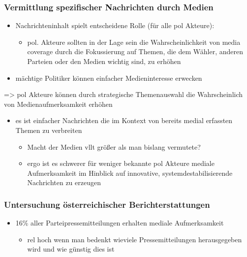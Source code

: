 \documentclass[11pt]{article}
\begin{document}
\subsubsection{Vermittlung spezifischer Nachrichten durch Medien}
\label{sec:org60a56c1}
\begin{itemize}
\item Nachrichteninhalt spielt entscheidene Rolle (für alle pol Akteure):
\begin{itemize}
\item pol. Akteure sollten in der Lage sein die Wahrscheinlichkeit von media coverage durch die Fokussierung auf Themen, die dem Wähler, anderen Parteien oder den Medien wichtig sind, zu erhöhen
\end{itemize}
\item mächtige Politiker können einfacher Medieninteresse erwecken
\end{itemize}

=> pol Akteure können durch strategische Themenauswahl die Wahrscheinlich von Medienaufmerksamkeit erhöhen

\begin{itemize}
\item es ist einfacher Nachrichten die im Kontext von bereits medial erfassten Themen zu verbreiten
\begin{itemize}
\item Macht der Medien vllt größer als man bislang vermutete?
\item ergo ist es schwerer für weniger bekannte pol Akteure mediale Aufmerksamkeit im Hinblick auf innovative, systemdestabilisierende Nachrichten zu erzeugen
\end{itemize}
\end{itemize}
\subsubsection{Untersuchung österreichischer Berichterstattungen}
\label{sec:orgc08eaea}
\begin{itemize}
\item 16\% aller Parteipressemitteilungen erhalten mediale Aufmerksamkeit
\begin{itemize}
\item rel hoch wenn man bedenkt wieviele Pressemitteilungen herausgegeben wird und wie günstig dies ist
\end{itemize}
\end{itemize}
\end{document}
